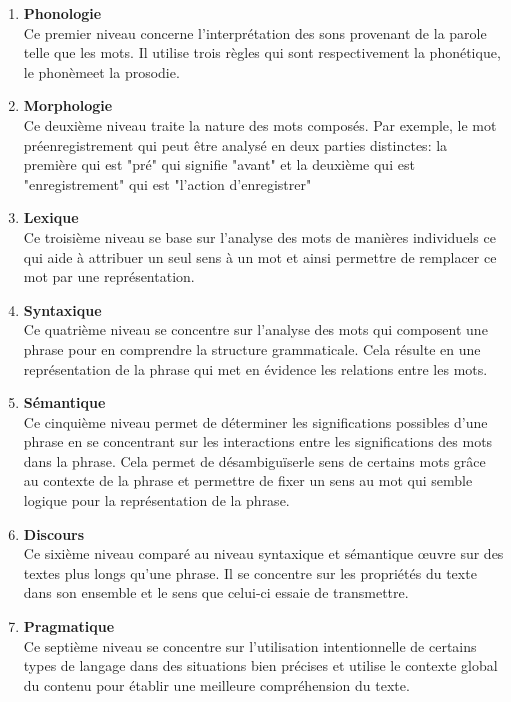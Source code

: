 \documentclass{rapport}
\begin{document}
\newpage
\begin{enumerate}[listparindent=0pt, parsep=0pt]

    \item \textbf{Phonologie}\\
    Ce premier niveau concerne l'interprétation des sons provenant de la parole telle que les mots. Il utilise trois règles qui sont respectivement la phonétique\footnotemark[1], le phonème\footnotemark[2] et la prosodie\footnotemark[3].\\

    
    \item \textbf{Morphologie}\\
    Ce deuxième niveau traite la nature des mots composés. Par exemple, le mot préenregistrement qui peut être analysé en deux parties distinctes: la première qui est "pré" qui signifie "avant" et la deuxième qui est "enregistrement" qui est "l'action d'enregistrer"\\
    
    \item \textbf{Lexique}\\
    Ce troisième niveau se base sur l'analyse des mots de manières individuels ce qui aide à attribuer un seul sens à un mot et ainsi permettre de remplacer ce mot par une représentation.\\

    \item \textbf{Syntaxique}\\
    Ce quatrième niveau se concentre sur l'analyse des mots qui composent une phrase pour en comprendre la structure grammaticale. Cela résulte en une représentation de la phrase qui met en évidence les relations entre les mots.\\

    \item \textbf{Sémantique}\\
    Ce cinquième niveau permet de déterminer les significations possibles d'une phrase en se concentrant sur les interactions entre les significations des mots dans la phrase. Cela permet de désambiguïser\footnotemark[4] le sens de certains mots grâce au contexte de la phrase et permettre de fixer un sens au mot qui semble logique pour la représentation de la phrase.\\
    
    \item \textbf{Discours}\\
    Ce sixième niveau comparé au niveau syntaxique et sémantique œuvre sur des textes plus longs qu'une phrase. Il se concentre sur les propriétés du texte dans son ensemble et le sens que celui-ci essaie de transmettre.\\
    
    \item \textbf{Pragmatique}\\
    Ce septième niveau se concentre sur l'utilisation intentionnelle de certains types de langage dans des situations bien précises et utilise le contexte global du contenu pour établir une meilleure compréhension du texte.\\

\end{enumerate}
\end{document}
